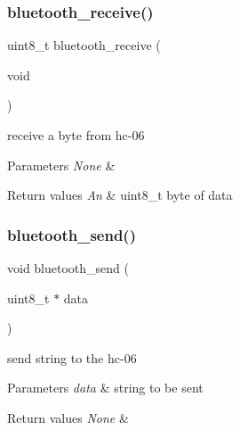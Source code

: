 \subsubsection{\texorpdfstring{bluetooth\+\_\+receive()}{bluetooth\_receive()}}
{\footnotesize\ttfamily uint8\+\_\+t bluetooth\+\_\+receive (\begin{DoxyParamCaption}\item[{void}]{ }\end{DoxyParamCaption})}



receive a byte from hc-\/06 


\begin{DoxyParams}{Parameters}
{\em None} & \\
\hline
\end{DoxyParams}

\begin{DoxyRetVals}{Return values}
{\em An} & uint8\+\_\+t byte of data \\
\hline
\end{DoxyRetVals}
\mbox{\label{group___transmission_ga31d829d5658369ee2c90b9c3cdbedfe1}} 
\subsubsection{\texorpdfstring{bluetooth\+\_\+send()}{bluetooth\_send()}}
{\footnotesize\ttfamily void bluetooth\+\_\+send (\begin{DoxyParamCaption}\item[{uint8\+\_\+t $\ast$}]{data }\end{DoxyParamCaption})}



send string to the hc-\/06 


\begin{DoxyParams}{Parameters}
{\em data} & string to be sent \\
\hline
\end{DoxyParams}

\begin{DoxyRetVals}{Return values}
{\em None} & \\
\hline
\end{DoxyRetVals}
